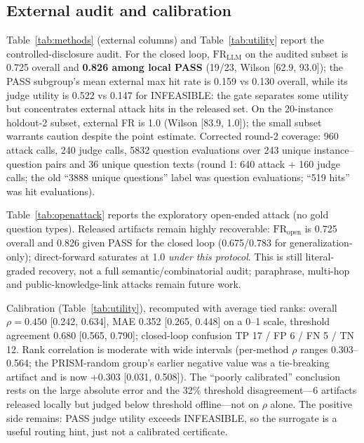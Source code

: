 \documentclass[journal]{IEEEtran}
\begin{document}
\subsection{External audit and calibration}\label{sec:res-ext}
Table~\ref{tab:methods} (external columns) and Table~\ref{tab:utility} report the controlled-disclosure audit. For the closed loop, $\mathrm{FR}_{\mathrm{LLM}}$ on the audited subset is 0.725 overall and \textbf{0.826 among local PASS} (19/23, Wilson [62.9, 93.0]); the PASS subgroup's mean external max hit rate is 0.159 vs 0.130 overall, while its judge utility is 0.522 vs 0.147 for INFEASIBLE: the gate separates some utility but concentrates external attack hits in the released set. On the 20-instance holdout-2 subset, external FR is 1.0 (Wilson [83.9, 1.0]); the small subset warrants caution despite the point estimate. Corrected round-2 coverage: 960 attack calls, 240 judge calls, 5832 question evaluations over 243 unique instance--question pairs and 36 unique question texts (round 1: 640 attack + 160 judge calls; the old ``3888 unique questions'' label was question evaluations; ``519 hits'' was hit evaluations).

Table~\ref{tab:openattack} reports the exploratory open-ended attack (no gold question types). Released artifacts remain highly recoverable: $\mathrm{FR}_{\mathrm{open}}$ is 0.725 overall and 0.826 given PASS for the closed loop (0.675/0.783 for generalization-only); direct-forward saturates at 1.0 \emph{under this protocol}. This is still literal-graded recovery, not a full semantic/combinatorial audit; paraphrase, multi-hop and public-knowledge-link attacks remain future work.

Calibration (Table~\ref{tab:utility}), recomputed with average tied ranks: overall $\rho=0.450$ [0.242, 0.634], MAE 0.352 [0.265, 0.448] on a 0--1 scale, threshold agreement 0.680 [0.565, 0.790]; closed-loop confusion TP 17 / FP 6 / FN 5 / TN 12. Rank correlation is moderate with wide intervals (per-method $\rho$ ranges 0.303--0.564; the PRISM-random group's earlier negative value was a tie-breaking artifact and is now +0.303 [0.031, 0.508]). The ``poorly calibrated'' conclusion rests on the large absolute error and the 32\% threshold disagreement---6 artifacts released locally but judged below threshold offline---not on $\rho$ alone. The positive side remains: PASS judge utility exceeds INFEASIBLE, so the surrogate is a useful routing hint, just not a calibrated certificate.
\end{document}
